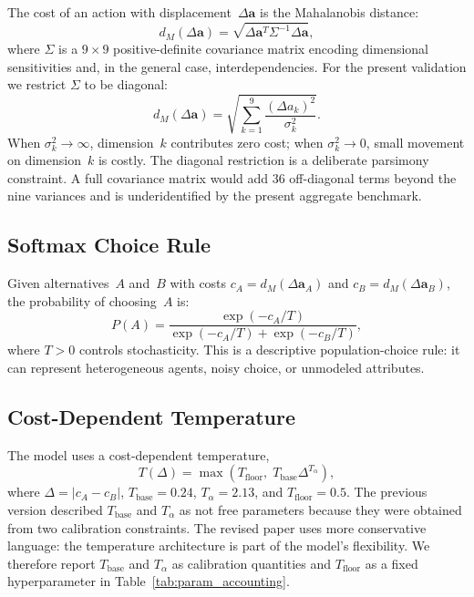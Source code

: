 \documentclass[journal]{IEEEtran}
\begin{document}
The cost of an action with displacement~$\Delta\mathbf{a}$ is the Mahalanobis distance:
\begin{equation}
    d_M(\Delta\mathbf{a}) = \sqrt{\Delta\mathbf{a}^T \Sigma^{-1} \Delta\mathbf{a}},
    \label{eq:mahalanobis}
\end{equation}
where $\Sigma$ is a $9 \times 9$ positive-definite covariance matrix encoding dimensional sensitivities and, in the general case, interdependencies.
For the present validation we restrict $\Sigma$ to be diagonal:
\begin{equation}
    d_M(\Delta\mathbf{a}) = \sqrt{\sum_{k=1}^{9} \frac{(\Delta a_k)^2}{\sigma_k^2}}.
    \label{eq:mahalanobis_diag}
\end{equation}
When $\sigma_k^2 \to \infty$, dimension~$k$ contributes zero cost; when $\sigma_k^2 \to 0$, small movement on dimension~$k$ is costly.
The diagonal restriction is a deliberate parsimony constraint.
A full covariance matrix would add 36 off-diagonal terms beyond the nine variances and is underidentified by the present aggregate benchmark.

\subsection{Softmax Choice Rule}

Given alternatives~$A$ and~$B$ with costs $c_A = d_M(\Delta\mathbf{a}_A)$ and $c_B = d_M(\Delta\mathbf{a}_B)$, the probability of choosing~$A$ is:
\begin{equation}
    P(A) = \frac{\exp(-c_A/T)}{\exp(-c_A/T) + \exp(-c_B/T)},
    \label{eq:softmax}
\end{equation}
where $T > 0$ controls stochasticity.
This is a descriptive population-choice rule: it can represent heterogeneous agents, noisy choice, or unmodeled attributes.

\subsection{Cost-Dependent Temperature}

The model uses a cost-dependent temperature,
\begin{equation}
    T(\Delta) = \max\!\left(T_{\text{floor}},\; T_{\text{base}} \Delta^{T_\alpha}\right),
    \label{eq:temperature}
\end{equation}
where $\Delta = |c_A - c_B|$, $T_{\text{base}} = 0.24$, $T_\alpha = 2.13$, and $T_{\text{floor}} = 0.5$.
The previous version described $T_{\text{base}}$ and $T_\alpha$ as not free parameters because they were obtained from two calibration constraints.
The revised paper uses more conservative language: the temperature architecture is part of the model's flexibility.
We therefore report $T_{\text{base}}$ and $T_\alpha$ as calibration quantities and $T_{\text{floor}}$ as a fixed hyperparameter in Table~\ref{tab:param_accounting}.
\end{document}
